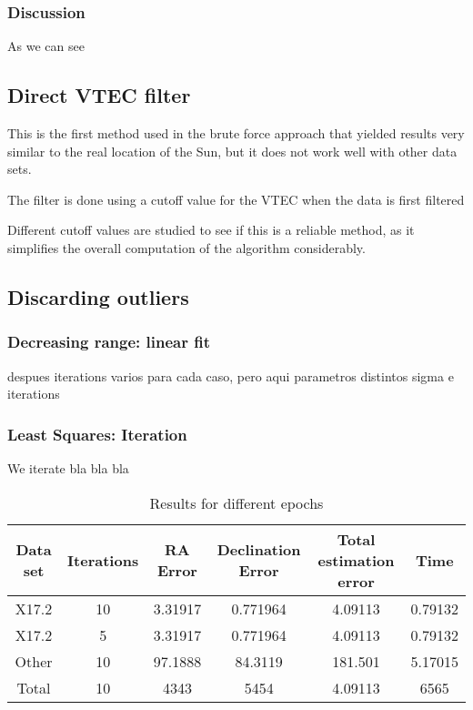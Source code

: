\subsubsection{Discussion}

As we can see

\subsection{Direct VTEC filter}

This is the first method used in the brute force approach that yielded results very similar to the real location of the Sun, but it does not work well with other data sets.

The filter is done using a cutoff value for the VTEC when the data is first filtered

Different cutoff values are studied to see if this is a reliable method, as it simplifies the overall computation of the algorithm considerably.

\subsection{Discarding outliers}

\subsubsection{Decreasing range: linear fit}

despues iterations varios para cada caso, pero aqui parametros distintos sigma e iterations

\subsubsection{Least Squares: Iteration}

We iterate bla bla bla

\begin{table}[h!]
	\centering
	\def\arraystretch{1.2}
	\begin{tabular}{|c c c c c c|} 
		\hline
		Data set & Iterations & RA Error & Declination Error & Total estimation error & Time \\ [0.5ex] 
		\hline\hline
		X17.2 & 10 & 3.31917 & 0.771964 & 4.09113 & 0.79132 \\
		\hline
		X17.2 & 5 & 3.31917 & 0.771964 & 4.09113 & 0.79132 \\
		\hline
		Other & 10 & 97.1888 & 84.3119 & 181.501 & 5.17015 \\
		\hline\hline
		Total & 10 & 4343 & 5454 & 4.09113 & 6565 \\
		\hline
	\end{tabular}
	\caption{Results for different epochs}
\end{table}

